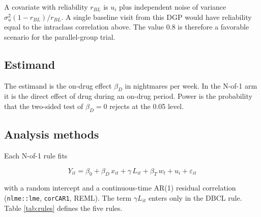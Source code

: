 \documentclass[
  11pt,
]{article}
\begin{document}
A covariate with reliability \(r_{BL}\) is \(u_i\) plus independent noise of variance \(\sigma_u^2(1 - r_{BL})/r_{BL}\). A single baseline visit from this DGP would have reliability equal to the intraclass correlation above. The value 0.8 is therefore a favorable scenario for the parallel-group trial.

\subsection{Estimand}\label{estimand}

The estimand is the on-drug effect \(\beta_D\) in nightmares per week. In the N-of-1 arm it is the direct effect of drug during an on-drug period. Power is the probability that the two-sided test of \(\beta_D = 0\) rejects at the 0.05 level.

\subsection{Analysis methods}\label{analysis-methods}

Each N-of-1 rule fits

\[Y_{it} = \beta_0 + \beta_D\, x_{it} + \gamma\, L_{it} + \beta_T\, w_t + u_i + \varepsilon_{it}\]

with a random intercept and a continuous-time AR(1) residual correlation (\texttt{nlme::lme}, \texttt{corCAR1}, REML). The term \(\gamma L_{it}\) enters only in the DBCL rule. Table \ref{tab:rules} defines the five rules.

\begin{table}[!h]
\centering
\caption{\label{tab:rules}N-of-1 analysis rules.}
\centering
{}
\end{table}
\end{document}
